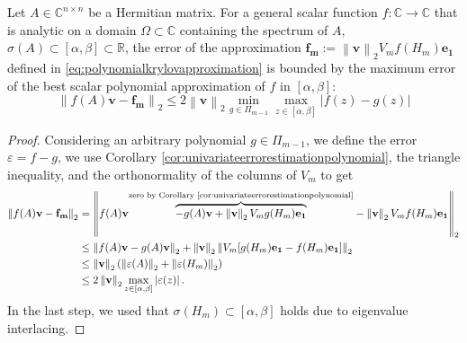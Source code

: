 \begin{theorem}
    \label{the:univariateerrorestimationgeneral}
    Let $A \in \mathbb{C}^{n \times n}$ be a Hermitian matrix. For a general scalar
    function $f: \mathbb{C} \to \mathbb{C}$ that is analytic on a domain
    $\Omega \subset \mathbb{C}$ containing the spectrum of $A$,
    $\sigma(A) \subset [\alpha, \beta] \subset \mathbb{R}$, the error of the approximation
    $\mathbf{f_m} := \left\| \mathbf{v} \right\|_{2} V_m f(H_m) \mathbf{e_1}$ defined in
    \eqref{eq:polynomialkrylovapproximation} is bounded by the maximum error of the best
    scalar polynomial approximation of $f$ in $[\alpha, \beta]$:
    \begin{equation}
        \label{eq:univariateerrorestimationgeneral}
        \left\| f(A)\mathbf{v} - \mathbf{f_m} \right\|_2 \le
        2 \left\| \mathbf{v} \right\|_2 \min_{g \in \Pi_{m-1}}
        \max_{z \in [\alpha, \beta]} \left|f(z) - g(z) \right|
    \end{equation}
\end{theorem}
\begin{proof}
    Considering an arbitrary polynomial $g \in \Pi_{m-1}$, we define the error
    $\varepsilon = f - g$, we use Corollary \ref{cor:univariateerrorestimationpolynomial},
    the triangle inequality, and the orthonormality of the columns of $V_m$ to get
    \begin{equation*}
        \begin{aligned}
            \left\| f(A)\mathbf{v} - \mathbf{f_m} \right\|_2
                & = \left\| f(A)\mathbf{v} \overset{\text{zero by Corollary \ref{cor:univariateerrorestimationpolynomial}}}
                {\overbrace{- g(A)\mathbf{v} + \left\| \mathbf{v} \right\|_{2} V_m g(H_m) \mathbf{e_1}}}
                - \left\| \mathbf{v} \right\|_{2} V_m f(H_m) \mathbf{e_1} \right\|_2 \\
            & \le \left\| f(A)\mathbf{v} - g(A)\mathbf{v} \right\|_{2}
                + \left\| \mathbf{v} \right\|_{2}
                \left\| V_m [g(H_m) \mathbf{e_1} - f(H_m) \mathbf{e_1}] \right\|_2\\
            & \le \left\| \mathbf{v} \right\|_2 \left( \left\| \varepsilon(A) \right\|_2 + \left\| \varepsilon(H_m) \right\|_2 \right)\\
            & \le 2 \left\| \mathbf{v} \right\|_2 \max_{z \in [\alpha, \beta]} \left| \varepsilon(z) \right|.
            \end{aligned}
    \end{equation*}
    In the last step, we used that $\sigma(H_m) \subset [\alpha, \beta]$
    holds due to eigenvalue interlacing.
\end{proof}

